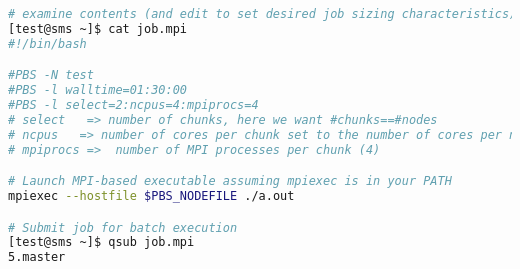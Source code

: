 \begin{lstlisting}[language=bash,keywords={}]
# examine contents (and edit to set desired job sizing characteristics)
[test@sms ~]$ cat job.mpi
#!/bin/bash

#PBS -N test
#PBS -l walltime=01:30:00
#PBS -l select=2:ncpus=4:mpiprocs=4
# select   => number of chunks, here we want #chunks==#nodes
# ncpus   => number of cores per chunk set to the number of cores per node (4)
# mpiprocs =>  number of MPI processes per chunk (4)

# Launch MPI-based executable assuming mpiexec is in your PATH
mpiexec --hostfile $PBS_NODEFILE ./a.out

# Submit job for batch execution
[test@sms ~]$ qsub job.mpi
5.master

\end{lstlisting}
